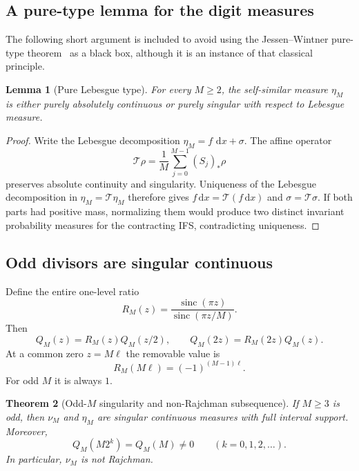 \documentclass[11pt,oneside]{article}
\newtheorem{theorem}{Theorem}[section]
\newtheorem{lemma}[theorem]{Lemma}
\theoremstyle{definition}
\theoremstyle{remark}
\newcommand{\sinc}{\operatorname{sinc}}
\newcommand{\dd}{\,\mathrm d}
\numberwithin{equation}{section}
\newcommand{\1}{\mathbf 1}
\begin{document}
\subsection{A pure-type lemma for the digit measures}

The following short argument is included to avoid using the Jessen--Wintner pure-type
theorem~\cite{JessenWintner1935} as a black box, although it is an instance of that classical principle.

\begin{lemma}[Pure Lebesgue type]
\label{lem:pure-type}
For every $M\ge2$, the self-similar measure $\eta_M$ is either purely absolutely
continuous or purely singular with respect to Lebesgue measure.
\end{lemma}

\begin{proof}
Write the Lebesgue decomposition $\eta_M=f\,\dd x+\sigma$.  The affine operator
\[
 \mathcal T\rho=\frac1M\sum_{j=0}^{M-1}(S_j)_*\rho
\]
preserves absolute continuity and singularity.  Uniqueness of the Lebesgue decomposition
in $\eta_M=\mathcal T\eta_M$ therefore gives
$f\dd x=\mathcal T(f\dd x)$ and $\sigma=\mathcal T\sigma$.  If both parts had positive
mass, normalizing them would produce two distinct invariant probability measures for the
contracting IFS, contradicting uniqueness.
\end{proof}

\subsection{Odd divisors are singular continuous}

Define the entire one-level ratio
\begin{equation}
 R_M(z)=\frac{\sinc(\pi z)}{\sinc(\pi z/M)}.
 \label{eq:RM}
\end{equation}
Then
\begin{equation}
 Q_M(z)=R_M(z)Q_M(z/2),
 \qquad
 Q_M(2z)=R_M(2z)Q_M(z).
 \label{eq:QM-doubling}
\end{equation}
At a common zero $z=M\ell$ the removable value is
\begin{equation}
 R_M(M\ell)=(-1)^{(M-1)\ell}.
 \label{eq:RM-common-zero}
\end{equation}
For odd $M$ it is always $1$.

\begin{theorem}[Odd-$M$ singularity and non-Rajchman subsequence]
\label{thm:odd-singular}
If $M\ge3$ is odd, then $\nu_M$ and $\eta_M$ are singular continuous measures with
full interval support.  Moreover,
\begin{equation}
 Q_M(M2^k)=Q_M(M)\ne0
 \qquad(k=0,1,2,\ldots).
 \label{eq:nondecay-subsequence}
\end{equation}
In particular, $\nu_M$ is not Rajchman.
\end{theorem}
\end{document}

